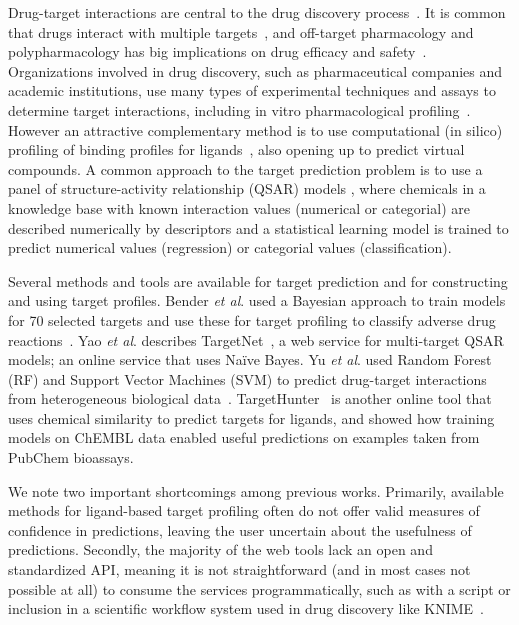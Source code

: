 \documentclass[utf8]{frontiersSCNS} %
\renewcommand{\todo}[1]{{\color{magenta}\oldtodo[fancyline]{\color{white}\textsf{#1}}}}
\begin{document}
Drug-target interactions are central to the drug discovery
process~\cite{Yildirim:2007vh}. It is common that drugs interact with multiple
targets~\cite{hopkins2008network}, and off-target pharmacology and
polypharmacology has big implications on drug efficacy and
safety~\cite{Peters:2013yg,Ravikumar:2018qd}. Organizations involved in drug
discovery, such as pharmaceutical companies and academic institutions, use many
types of experimental techniques and assays to determine target interactions,
including in vitro pharmacological profiling~\cite{Bowes2012}. However an
attractive complementary method is to use computational (in silico) profiling
of binding profiles for ligands~\cite{Cereto-Massague:2015px}, also opening up
to predict virtual compounds. A common approach to the target prediction
problem is to use a panel of structure-activity relationship (QSAR) models%
, where chemicals in a knowledge base with known interaction values (numerical
or categorial) are described numerically by descriptors and a statistical
learning model is trained to predict numerical values (regression) or
categorial values (classification). %

Several methods and tools are available for target prediction and for
constructing and using target profiles.
%
Bender \textit{et al}. used a Bayesian approach to train models for 70 selected targets
and use these for target profiling to classify adverse drug
reactions~\cite{Bender:2007ib}.
%
Yao \textit{et al}. describes TargetNet~\cite{Yao:2016ij}, a web service for
multi-target QSAR models; an online service that uses Na\"ive Bayes.
%
Yu \textit{et al}. used Random Forest (RF) and Support Vector Machines (SVM) to predict
drug-target interactions from heterogeneous biological data~\cite{Yu:2012ol}.
%
TargetHunter~\cite{Wang:2013le} is another online tool that uses chemical
similarity to predict targets for ligands, and showed how training models on
ChEMBL data enabled useful predictions on examples taken from PubChem
bioassays.

We note two important shortcomings among previous works. Primarily, available
methods for ligand-based target profiling often do not offer valid measures of
confidence in predictions, leaving the user uncertain about the usefulness of
predictions. Secondly, the majority of the web tools lack an open and
standardized API, meaning it is not straightforward (and in most cases not
possible at all) to consume the services programmatically, such as with a
script or inclusion in a scientific workflow system used in drug discovery like
KNIME~\cite{Mazanetz:2012gy}.
\end{document}

